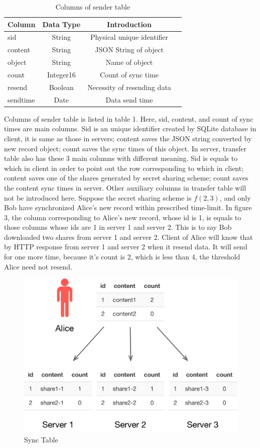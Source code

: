 \documentclass[twocolumn,10pt]{article}
\begin{document}
\begin{table}[tbp]
	\centering  
	\begin{tabular}{lccc}  
		\hline
		Column &Data Type & Introduction\\ 
		\hline  
		sid &String & Physical unique identifier\\
		content & String & JSON String of object\\ 
		object & String & Name of object\\
		count & Integer16 & Count of sync time\\
		resend & Boolean &Necessity of resending data \\
		sendtime & Date & Data send time\\
		\hline
	\end{tabular}
	\caption{Columns of sender table}
\end{table}

Columns of sender table is listed in table 1. Here, sid, content, and count of sync times are main columns. Sid is an unique identifier created by SQLite database in client, it is same as those in servers; content saves the JSON string converted by new record object; count saves the sync times of this object. In server, transfer table also has these 3 main columns with different meaning. Sid is equals to which in client in order to point out the row corresponding to which in client; content saves one of the shares generated by secret sharing scheme; count saves the content sync times in server. Other auxiliary columns in transfer table will not be introduced here.
Suppose the secret sharing scheme is $f(2, 3)$, and only Bob have synchronized Alice's new record within prescribed time-limit. In figure 3, the column corresponding to Alice's new record, whose id is 1, is equals to those columns whose ids are 1 in server 1 and server 2. This is to say Bob downloaded two shares from server 1 and server 2. Client of Alice will know that by HTTP response from server 1 and server 2 when it resend data. It will send for one more time, because it's count is 2, which is less than 4, the threshold Alice need not resend.

\begin{figure}[t]
\centering
\includegraphics[scale=0.4]{sync_table}
\caption{Sync Table}
\end{figure}
\end{document}
